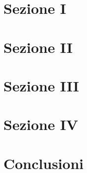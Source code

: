 \documentclass{beamer}
\begin{document}
\section{Sezione I}


\section{Sezione II}


\section{Sezione III}


\section{Sezione IV}


\section{Conclusioni}

\end{document}
